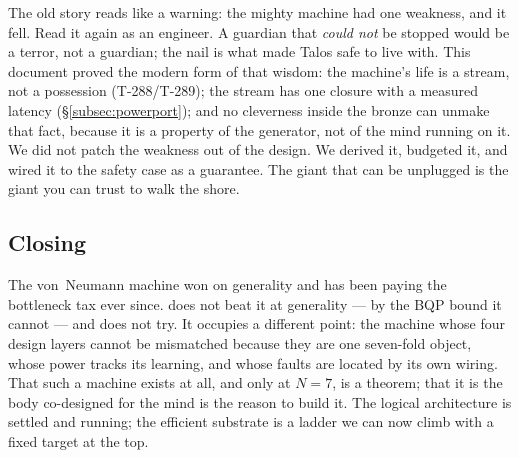 \begin{mythbox}
The old story reads like a warning: the mighty machine had one weakness, and
it fell. Read it again as an engineer. A guardian that \emph{could not} be
stopped would be a terror, not a guardian; the nail is what made Talos safe
to live with. This document proved the modern form of that wisdom: the
machine's life is a stream, not a possession (T-288/T-289); the stream has
one closure with a measured latency (\S\ref{subsec:powerport}); and no
cleverness inside the bronze can unmake that fact, because it is a property
of the generator, not of the mind running on it. We did not patch the
weakness out of the design. We derived it, budgeted it, and wired it to the
\SYNARC{} safety case as a guarantee. The giant that can be unplugged is the
giant you can trust to walk the shore.
\end{mythbox}

\subsection{Closing}

The von~Neumann machine won on generality and has been paying the bottleneck
tax ever since. \TALOS{} does not beat it at generality --- by the BQP bound
it cannot --- and does not try. It occupies a different point: the machine
whose four design layers cannot be mismatched because they are one seven-fold
object, whose power tracks its learning, and whose faults are located by its
own wiring. That such a machine exists at all, and only at $N=7$, is a
theorem; that it is the body co-designed for the \SYNARC{} mind is the reason
to build it. The logical architecture is settled and running; the efficient
substrate is a ladder we can now climb with a fixed target at the top.
